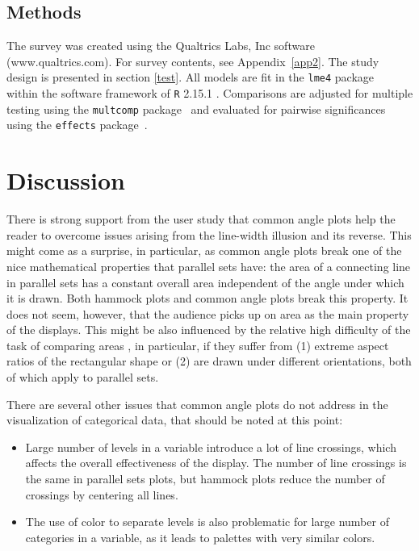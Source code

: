 \documentclass[journal]{vgtc}\usepackage{graphicx, color}
\begin{document}
\subsection{Methods}

The survey was created using the Qualtrics Labs, Inc software (www.qualtrics.com). For survey contents, see Appendix~\ref{app2}. The study design is presented in section \ref{test}. All models are fit in the {\tt lme4} package~\citep{lmer} within the software framework of {\tt R} 2.15.1 \citep{R}. Comparisons are adjusted for multiple testing using the {\tt multcomp} package~\citep{multcomp} and evaluated for pairwise significances using the {\tt effects} package~\citep{effects}.


\section{Discussion}
There is strong support from the user study that common angle plots help the reader to overcome issues arising from the line-width illusion and its reverse. This might come as a surprise, in particular, as common angle plots break one of the nice mathematical properties that parallel sets have:
the area of a connecting line in parallel sets has a constant  overall area  independent of the angle under which it is drawn. Both hammock plots and common angle plots break this property. It does not seem, however, that the audience picks up on area as the main property of the displays. This might be also influenced by the relative high difficulty of the task of comparing areas \citep{heer:2010, kong:2010}, in particular, if they suffer from  (1) extreme aspect ratios of the rectangular shape or (2) are drawn under different orientations, both of which apply to parallel sets. 

There are several other issues that common angle plots do not address in the visualization of categorical data, that should be noted at this point: \begin{itemize}
\item Large number of levels in a variable introduce a lot of line crossings, which affects the overall effectiveness of the display. The number of line crossings is the same in parallel sets plots, but hammock plots reduce the number of crossings by centering all lines.
\item The use of color to separate levels is also problematic for large number of categories in a variable, as it leads to  palettes with very similar colors.
\end{itemize}
\end{document}
